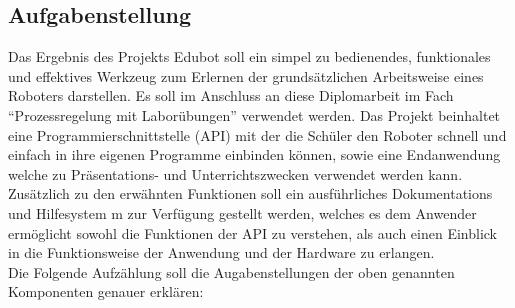 \subsection{Aufgabenstellung}
Das Ergebnis des Projekts Edubot soll ein simpel zu bedienendes, funktionales und effektives Werkzeug zum Erlernen der grundsätzlichen Arbeitsweise eines Roboters darstellen. Es soll im Anschluss an diese Diplomarbeit im Fach “Prozessregelung mit Laborübungen” verwendet werden. Das Projekt beinhaltet eine Programmierschnittstelle (API) mit der die Schüler den Roboter schnell und einfach in ihre eigenen Programme einbinden können, sowie eine Endanwendung welche zu Präsentations- und Unterrichtszwecken verwendet werden kann.
\\[0.5em]
Zusätzlich zu den erwähnten Funktionen soll ein ausführliches Dokumentations und Hilfesystem m zur Verfügung gestellt werden, welches es dem Anwender ermöglicht sowohl die Funktionen der API zu verstehen, als auch einen Einblick in die Funktionsweise der Anwendung und der Hardware zu erlangen.
\\[0.5em]
Die Folgende Aufzählung soll die Augabenstellungen der oben genannten Komponenten genauer erklären:

